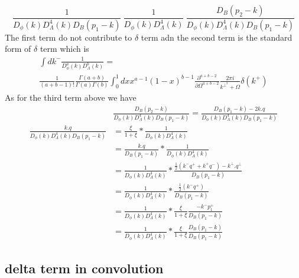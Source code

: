 \documentclass[preprintnumbers,prd,superscriptaddress,preprint]{revtex4-1}
\begin{document}
	\[
	\frac{1}{D_{\phi}(k)D_{\Lambda}^{4}(k)D_{B}(p_{1}-k)}\ \frac{1}{D_{\phi}(k)D_{\Lambda}^{4}(k)}\ \frac{D_{B}(p_{2}-k)}{D_{\phi}(k)D_{\Lambda}^{4}(k)D_{B}(p_{1}-k)}
	\]
	The first term do not contribute to $\delta$ term adn the second term is the standard form of $\delta$ term which is 
	\begin{multline*}
		\int dk^{-}\frac{1}{D_{\phi}^{a}(k)D_{\Lambda}^{b}(k)}=\\
		\frac{1}{(a+b-1)!}\frac{\Gamma(a+b)}{\Gamma(a)\Gamma(b)}\int_{0}^{1}dxx^{a-1}(1-x)^{b-1}\frac{\partial^{a+b-2}}{\partial\Omega^{a+b-2}}\frac{2\pi i}{k^{\perp^{2}}+\Omega}\delta(k^{+})
	\end{multline*}
	As for the third term above we have 
	\begin{align*}
		& \frac{D_{B}(p_{2}-k)}{D_{\phi}(k)D_{\Lambda}^{4}(k)D_{B}(p_{1}-k)} =\frac{D_{B}(p_{1}-k)-2k.q}{D_{\phi}(k)D_{\Lambda}^{4}(k)D_{B}(p_{1}-k)}\\
		\frac{k.q}{D_{\phi}(k)D_{\Lambda}^{4}(k)D_{B}(p_{1}-k)} & =\frac{\xi}{1+\xi}*\frac{1}{D_{\phi}(k)D_{\Lambda}^{4}(k)}\\
		& =\frac{k.q}{D_{B}(p_{1}-k)}*\frac{1}{D_{\phi}(k)D_{\Lambda}^{4}(k)}\\
		& =\frac{1}{D_{\phi}(k)D_{\Lambda}^{4}(k)}*\frac{\frac{1}{2}(k^{-}q^{+}+k^{+}q^{-})-k^{\perp}.q^{\perp}}{D_{B}(p_{1}-k)}\\
		& =\frac{1}{D_{\phi}(k)D_{\Lambda}^{4}(k)}*\frac{\frac{1}{2}(k^{-}q^{+})}{D_{B}(p_{1}-k)}\\
		& =\frac{1}{D_{\phi}(k)D_{\Lambda}^{4}(k)}*\frac{\xi}{1+\xi}\frac{-k^{-}p_{1}^{+}}{D_{B}(p_{1}-k)}\\
		& =\frac{1}{D_{\phi}(k)D_{\Lambda}^{4}(k)}*\frac{\xi}{1+\xi}\frac{D_{B}(p_{1}-k)}{D_{B}(p_{1}-k)}
	\end{align*}
	\subsection{delta term in convolution}
\end{document}
